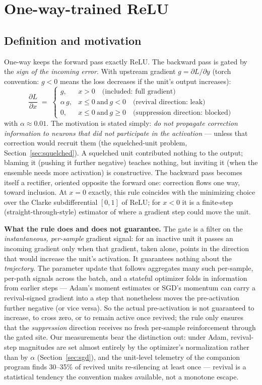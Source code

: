 \documentclass[11pt]{article}
\newcommand{\relu}{\mathrm{ReLU}}
\begin{document}
\section{One-way-trained ReLU}

\subsection{Definition and motivation}

One-way keeps the forward pass exactly $\relu$. The backward pass is
gated by the \emph{sign of the incoming error}. With upstream gradient
$g = \partial L / \partial y$ (torch convention: $g < 0$ means the loss
decreases if the unit's output increases):
\[
\frac{\partial L}{\partial x} \;=\;
\begin{cases}
g, & x > 0 \quad\text{(included: full gradient)}\\[2pt]
\alpha\, g, & x \le 0 \ \text{and}\ g < 0 \quad\text{(revival direction: leak)}\\[2pt]
0, & x \le 0 \ \text{and}\ g \ge 0 \quad\text{(suppression direction: blocked)}
\end{cases}
\]
with $\alpha \approx 0.01$. The motivation is stated simply: \emph{do not
propagate correction information to neurons that did not participate in
the activation} --- unless that correction would recruit them
(the squelched-unit problem, Section~\ref{sec:squelched}). A squelched
unit contributed nothing to the output; blaming it (pushing it further
negative) teaches nothing, but inviting it (when the ensemble needs more
activation) is constructive. The backward pass becomes itself a rectifier,
oriented opposite the forward one: correction flows one way, toward
inclusion. At $x{=}0$ exactly, this rule coincides with the minimizing
choice over the Clarke subdifferential $[0,1]$ of $\relu$; for $x < 0$ it
is a finite-step (straight-through-style) estimator of where a gradient
step could move the unit.

\textbf{What the rule does and does not guarantee.} The gate is a
filter on the \emph{instantaneous, per-sample} gradient signal: for
an inactive unit it passes an incoming gradient only when that
gradient, taken alone, points in the direction that would increase
the unit's activation. It guarantees nothing about the
\emph{trajectory}. The parameter update that follows aggregates many
such per-sample, per-path signals across the batch, and a stateful
optimizer folds in information from earlier steps --- Adam's moment
estimates or SGD's momentum can carry a revival-signed gradient into
a step that nonetheless moves the pre-activation further negative
(or vice versa). So the actual pre-activation is not guaranteed to
increase, to cross zero, or to remain active once revived; the rule
only ensures that the \emph{suppression} direction receives no fresh
per-sample reinforcement through the gated site. Our measurements
bear the distinction out: under Adam, revival-step magnitudes are
set almost entirely by the optimizer's normalization rather than by
$\alpha$ (Section~\ref{sec:sgd}), and the unit-level telemetry of
the companion program finds 30--35\% of revived units re-silencing
at least once --- revival is a statistical tendency the convention
makes available, not a monotone escape.
\end{document}
